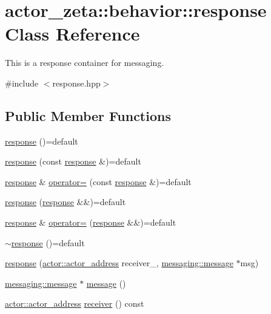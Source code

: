 \hypertarget{classactor__zeta_1_1behavior_1_1response}{}\section{actor\+\_\+zeta\+:\+:behavior\+:\+:response Class Reference}
\label{classactor__zeta_1_1behavior_1_1response}


This is a response container for messaging.  




{\ttfamily \#include $<$response.\+hpp$>$}

\subsection*{Public Member Functions}
\begin{DoxyCompactItemize}
\item 
\hyperlink{classactor__zeta_1_1behavior_1_1response_aca59baf848575262bbe2ec9a45fc3295}{response} ()=default
\item 
\hyperlink{classactor__zeta_1_1behavior_1_1response_a52522b1ab1206284c49b774f8f4592b9}{response} (const \hyperlink{classactor__zeta_1_1behavior_1_1response}{response} \&)=default
\item 
\hyperlink{classactor__zeta_1_1behavior_1_1response}{response} \& \hyperlink{classactor__zeta_1_1behavior_1_1response_affcc0aab81cdc00ff9320dd7fe6048ff}{operator=} (const \hyperlink{classactor__zeta_1_1behavior_1_1response}{response} \&)=default
\item 
\hyperlink{classactor__zeta_1_1behavior_1_1response_aa32aab977af64fb95fe7257cfd1bad5b}{response} (\hyperlink{classactor__zeta_1_1behavior_1_1response}{response} \&\&)=default
\item 
\hyperlink{classactor__zeta_1_1behavior_1_1response}{response} \& \hyperlink{classactor__zeta_1_1behavior_1_1response_ad9b1bd1e4aabb899bc196036a111b427}{operator=} (\hyperlink{classactor__zeta_1_1behavior_1_1response}{response} \&\&)=default
\item 
\hyperlink{classactor__zeta_1_1behavior_1_1response_a3b6c18b40faedefdfba5a1d510c2b13e}{$\sim$response} ()=default
\item 
\hyperlink{classactor__zeta_1_1behavior_1_1response_a174f5c5b8ef1a7e6d4f8f0dea9a95c25}{response} (\hyperlink{classactor__zeta_1_1actor_1_1actor__address}{actor\+::actor\+\_\+address} receiver\+\_\+, \hyperlink{classactor__zeta_1_1messaging_1_1message}{messaging\+::message} $\ast$msg)
\item 
\hyperlink{classactor__zeta_1_1messaging_1_1message}{messaging\+::message} $\ast$ \hyperlink{classactor__zeta_1_1behavior_1_1response_a9aa9d35dd338b665fa12ada58b36fe63}{message} ()
\item 
\hyperlink{classactor__zeta_1_1actor_1_1actor__address}{actor\+::actor\+\_\+address} \hyperlink{classactor__zeta_1_1behavior_1_1response_a9735663735901d299d5c8d6ea79005e3}{receiver} () const
\end{DoxyCompactItemize}


